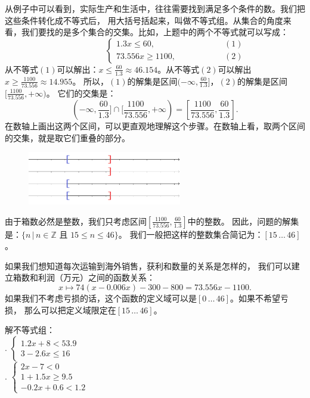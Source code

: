 \documentclass[12pt,UTF8]{ctexbook}
\begin{document}
从例子中可以看到，实际生产和生活中，往往需要找到满足多个条件的数。我们把这些条件转化成不等式后，
用大括号括起来，叫做不等式组。从集合的角度来看，我们要找的是多个集合的交集。比如，上题中的两个不等式就可以写成：
$$ \quad \quad \quad \quad \quad\left\{
\begin{array}{cr}
    1.3x \leqslant 60, & \quad \quad \quad \quad \quad (1) \\
    73.556x \geqslant 1100, & \quad \quad \quad \quad \quad (2)
\end{array}\right.
$$
从不等式$(1)$可以解出：$x \leqslant \frac{60}{1.3} \approx 46.154$。从不等式$(2)$可以解出$x \geqslant \frac{1100}{73.556} \approx 14.955$。
所以，$(1)$的解集是区间$(-\infty, \frac{60}{1.3}]$，$(2)$的解集是区间$[\frac{1100}{73.556}, +\infty)$。
它们的交集是：
$$(-\infty, \frac{60}{1.3}] \cap [\frac{1100}{73.556}, +\infty)  = [\frac{1100}{73.556}, \frac{60}{1.3}]. $$
在数轴上画出这两个区间，可以更直观地理解这个步骤。在数轴上看，取两个区间的交集，就是取它们重叠的部分。

\begin{figure}[H] %
    \vspace{8pt}
    \centering
    \includegraphics[width=0.6\textwidth]{tu/一元一次不等式组1.png}
\end{figure}

由于箱数必然是整数，我们只考虑区间$[\frac{1100}{73.556}, \frac{60}{1.3}]$中的整数。
因此，问题的解集是：$\{n \, | \, n \in \mathbb{Z} \mbox{ 且 }15 \leqslant n \leqslant 46\}$。
我们一般把这样的整数集合简记为：$[15 \, \ldots \, 46]$。

如果我们想知道每次运输到海外销售，获利和数量的关系是怎样的，
我们可以建立箱数和利润（万元）之间的函数关系：
$$ x \mapsto 74 (x - 0.006x) - 300 - 800 = 73.556 x - 1100. $$
如果我们不考虑亏损的话，这个函数的定义域可以是$[0 \, \ldots \, 46]$。如果不希望亏损，
那么可以把定义域限定在$[15 \, \ldots \, 46]$。

\begin{xt}\label{xt:5-5-0}
    解不等式组：\\
    . $\left\{
        \begin{array}{cr}
            1.2x + 8 < 53.9 \\
            3 - 2.6x \leqslant 16 
        \end{array}\right.$ \\
    . $\left\{
        \begin{array}{cr}
            2x - 7 < 0 \\
            1 + 1.5x \geqslant 9.5 \\
            -0.2x + 0.6 < 1.2 
        \end{array}\right.$ 
\end{xt}
\end{document}
